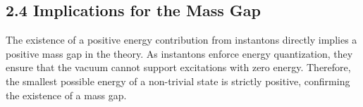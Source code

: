 \documentclass{article}
\begin{document}
\subsection*{2.4 Implications for the Mass Gap}
The existence of a positive energy contribution from instantons directly implies a positive mass gap in the theory. As instantons enforce energy quantization, they ensure that the vacuum cannot support excitations with zero energy. Therefore, the smallest possible energy of a non-trivial state is strictly positive, confirming the existence of a mass gap.
\end{document}
